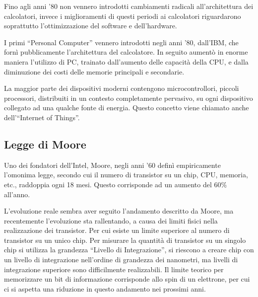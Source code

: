 \documentclass{article}
\numberwithin{equation}{subsection}
\begin{document}
Fino agli anni '80 non vennero introdotti cambiamenti radicali all'architettura dei calcolatori, invece i miglioramenti di questi periodi ai calcolatori riguardarono soprattutto 
l'ottimizzazione del software e dell'hardware. 

I primi ``Personal Computer'' vennero introdotti negli anni '80, dall'IBM, che fornì pubblicamente l'architettura del calcolatore. In seguito aumentò in enorme maniera 
l'utilizzo di PC, trainato dall'aumento delle capacità della CPU, e dalla diminuzione dei costi delle memorie principali e secondarie. 



La maggior parte dei dispositivi moderni contengono microcontrollori, piccoli processori, distribuiti in un contesto completamente pervasivo, su ogni dispositivo collegato 
ad una qualche fonte di energia. Questo concetto viene chiamato anche dell'``Internet of Things''.  

\subsection{Legge di Moore}

Uno dei fondatori dell'Intel, Moore, negli anni '60 definì empiricamente l'omonima legge, secondo cui il numero di transistor su un chip, CPU, memoria, etc., raddoppia ogni 18 
mesi. Questo corrisponde ad un aumento del 60\% all'anno. 

L'evoluzione reale sembra aver seguito l'andamento descritto da Moore, ma recentemente l'evoluzione sta rallentando, a causa dei limiti fisici nella 
realizzazione dei transistor. Per cui esiste un limite superiore al numero di transistor su un unico chip. 
Per misurare la quantità di transistor su un singolo chip si utilizza la grandezza ``Livello di Integrazione'', si riescono a creare chip con un livello di 
integrazione nell'ordine di grandezza dei nanometri, ma livelli di integrazione superiore sono difficilmente realizzabili. Il limite teorico per memorizzare un bit di informazione 
corrisponde allo spin di un elettrone, per cui ci si aspetta una riduzione in questo andamento nei prossimi anni. 
\end{document}
